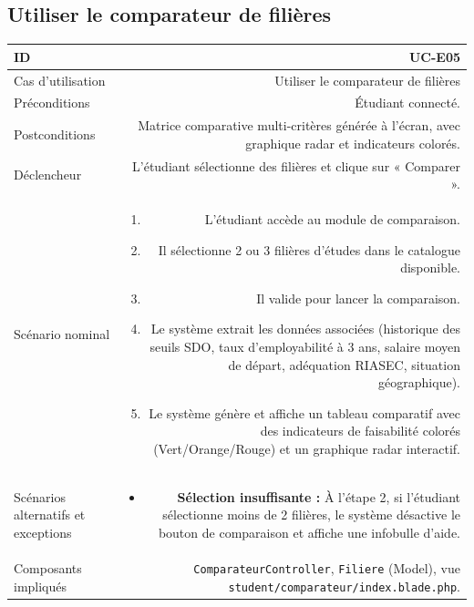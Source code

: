 \vspace{1.5em}

\subsection{Utiliser le comparateur de filières}

\noindent
{}
\begin{tabularx}{\linewidth}{|L|R|}
\hline
{}ID & UC-E05 \\
\hline
Cas d'utilisation & Utiliser le comparateur de filières \\
\hline
{}Préconditions & Étudiant connecté. \\
\hline
Postconditions & Matrice comparative multi-critères générée à l'écran, avec graphique radar et indicateurs colorés. \\
\hline
{}Déclencheur & L'étudiant sélectionne des filières et clique sur « Comparer ». \\
\hline
Scénario nominal &
\begin{enumerate}[nosep,leftmargin=*]
  \item L'étudiant accède au module de comparaison.
  \item Il sélectionne 2 ou 3 filières d'études dans le catalogue disponible.
  \item Il valide pour lancer la comparaison.
  \item Le système extrait les données associées (historique des seuils SDO, taux d'employabilité à 3 ans, salaire moyen de départ, adéquation RIASEC, situation géographique).
  \item Le système génère et affiche un tableau comparatif avec des indicateurs de faisabilité colorés (Vert/Orange/Rouge) et un graphique radar interactif.
\end{enumerate} \\
\hline
{}Scénarios alternatifs et exceptions &
\begin{itemize}[nosep,leftmargin=*]
  \item \textbf{Sélection insuffisante :} À l'étape 2, si l'étudiant sélectionne moins de 2 filières, le système désactive le bouton de comparaison et affiche une infobulle d'aide.
\end{itemize} \\
\hline
Composants impliqués & \texttt{ComparateurController}, \texttt{Filiere} (Model), vue \texttt{student/comparateur/index.blade.php}. \\
\hline
\end{tabularx}

